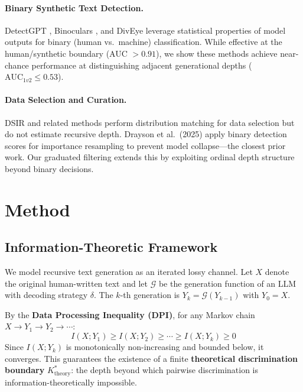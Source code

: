 \documentclass[11pt,a4paper]{article}
\begin{document}
\paragraph{Binary Synthetic Text Detection.}
DetectGPT \cite{mitchell2023detectgpt}, Binoculars \cite{hans2024binoculars}, and DivEye leverage statistical properties of model outputs for binary (human vs.\ machine) classification.
While effective at the human/synthetic boundary (AUC $> 0.91$), we show these methods achieve near-chance performance at distinguishing adjacent generational depths ($\text{AUC}_{1v2} \leq 0.53$).

\paragraph{Data Selection and Curation.}
DSIR \cite{xie2023dsir} and related methods perform distribution matching for data selection but do not estimate recursive depth.
Drayson et al.\ (2025) apply binary detection scores for importance resampling to prevent model collapse---the closest prior work.
Our graduated filtering extends this by exploiting ordinal depth structure beyond binary decisions.

\section{Method}

\subsection{Information-Theoretic Framework}

We model recursive text generation as an iterated lossy channel.
Let $X$ denote the original human-written text and let $\mathcal{G}$ be the generation function of an LLM with decoding strategy $\delta$.
The $k$-th generation is $Y_k = \mathcal{G}(Y_{k-1})$ with $Y_0 = X$.

By the \textbf{Data Processing Inequality (DPI)}, for any Markov chain $X \to Y_1 \to Y_2 \to \cdots$:
\begin{equation}
I(X; Y_1) \geq I(X; Y_2) \geq \cdots \geq I(X; Y_k) \geq 0
\end{equation}
Since $I(X; Y_k)$ is monotonically non-increasing and bounded below, it converges.
This guarantees the existence of a finite \textbf{theoretical discrimination boundary} $K^*_{\text{theory}}$: the depth beyond which pairwise discrimination is information-theoretically impossible.
\end{document}
